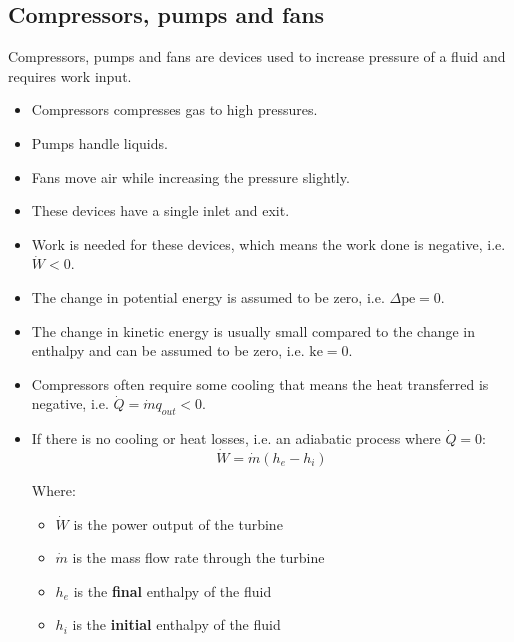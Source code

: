 \documentclass[11pt]{article}
\begin{document}
\newpage

\subsection{Compressors, pumps and fans}
\label{sec:org8a5926e}
Compressors, pumps and fans are devices used to increase pressure of a fluid and requires work input.
\begin{itemize}
\item Compressors compresses gas to high pressures.
\item Pumps handle liquids.
\item Fans move air while increasing the pressure slightly.
\item These devices have a single inlet and exit.
\item Work is needed for these devices, which means the work done is negative, i.e. \(\dot{W} < 0\).
\item The change in potential energy is assumed to be zero, i.e. \(\Delta \text{pe} = 0\).
\item The change in kinetic energy is usually small compared to the change in enthalpy and can be assumed to be zero, i.e. \(\text{ke} = 0\).
\item Compressors often require some cooling that means the heat transferred is negative, i.e. \(\dot{Q} = \dot{m} q_{out} < 0\).
\item If there is no cooling or heat losses, i.e. an adiabatic process where \(\dot{Q} = 0\):
\[\dot{W} = \dot{m} \left(h_e - h_i \right)\]

Where:
\begin{itemize}
\item \(\dot{W}\) is the power output of the turbine
\item \(\dot{m}\) is the mass flow rate through the turbine
\item \(h_e\) is the \textbf{final} enthalpy of the fluid
\item \(h_i\) is the \textbf{initial} enthalpy of the fluid
\end{itemize}
\end{itemize}

\newpage
\end{document}
